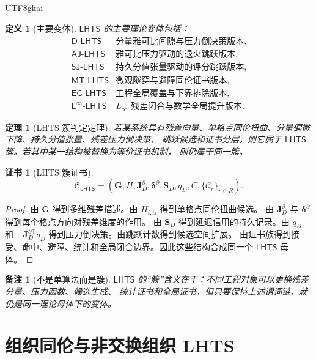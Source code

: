 \documentclass[12pt]{article}
\newtheorem{definition}{定义}[section]
\newtheorem{theorem}{定理}[section]
\newtheorem{remark}{备注}[section]
\newtheorem{Certificate}{证书}[section]
\newcommand{\LHTS}{\ensuremath{\mathsf{LHTS}}}
\newcommand{\DLHTS}{\ensuremath{\mathsf{D\mbox{-}LHTS}}}
\newcommand{\Linfty}{\ensuremath{L_\infty}}
\begin{document}
\begin{CJK*}{UTF8}{gkai}
\begin{definition}[主要变体]
\LHTS{} 的主要理论变体包括：
\[
\begin{array}{ll}
\DLHTS & \text{分量雅可比间隙与压力倒决策版本},\\
\mathsf{AJ\mbox{-}LHTS} & \text{雅可比压力驱动的退火跳跃版本},\\
\mathsf{SJ\mbox{-}LHTS} & \text{持久分值张量驱动的评分跳跃版本},\\
\mathsf{MT\mbox{-}LHTS} & \text{微观隧穿与避障同伦证书版本},\\
\mathsf{EG\mbox{-}LHTS} & \text{工程全局覆盖与下界排除版本},\\
\mathsf{L^\infty\mbox{-}LHTS} & \text{\(\Linfty\) 残差闭合与数学全局提升版本}.
\end{array}
\]
\end{definition}

\begin{theorem}[LHTS 簇判定定理]
\label{thm:lhts-family-criterion}
若某系统具有残差向量、单格点同伦扭曲、分量偏微下降、持久分值张量、残差压力倒决策、
跳跃候选和证书分层，则它属于 \LHTS{} 簇。若其中某一结构被替换为等价证书机制，
则仍属于同一簇。
\end{theorem}

\begin{Certificate}[LHTS 簇证书]
\[
  \mathcal C_{\LHTS}
  =
  \left(
  \mathbf G,
  H,
  \mathbf J_D^\partial,
  \boldsymbol\delta^\partial,
  \mathbf S_D,
  q_D,
  C,
  \{\mathcal C_r\}_{r\in R}
  \right).
\]
\end{Certificate}

\begin{proof}
由 \(\mathbf G\) 得到多维残差描述。由 \(H_{i,\alpha}\) 得到单格点同伦扭曲候选。
由 \(\mathbf J_D^\partial\) 与 \(\boldsymbol\delta^\partial\) 得到每个格点方向对残差维度的作用。
由 \(\mathbf S_D\) 得到延迟信用的持久记录。由 \(q_D\) 和
\(-\mathbf J_D^{\partial\top}q_D\) 得到压力倒决策。由跳跃计数得到候选空间扩展。
由证书族得到接受、命中、避障、统计和全局闭合边界。因此这些结构合成同一个
\LHTS{} 母体。
\end{proof}

\begin{remark}[不是单算法而是簇]
\LHTS{} 的“簇”含义在于：不同工程对象可以更换残差分量、压力函数、候选生成、
统计证书和全局证书，但只要保持上述谓词链，就仍是同一理论母体下的变体。
\end{remark}

\section{组织同伦与非交换组织 LHTS}
\label{sec:lhts-org-nc}


\end{CJK*}
\end{document}
